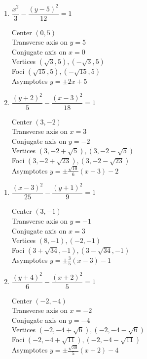 \begin{multicols}{2}
\begin{enumerate}
\setcounter{enumi}{\value{HW}}


\item $\dfrac{x^{2}}{3} - \dfrac{(y - 5)^{2}}{12} = 1$

Center $(0, 5)$\\
Transverse axis on $y = 5$\\
Conjugate axis on $x = 0$\\
Vertices $(\sqrt{3}, 5), (-\sqrt{3}, 5)$\\
Foci $(\sqrt{15}, 5), (-\sqrt{15}, 5)$\\
Asymptotes $y = \pm 2x + 5$

\item $\dfrac{(y + 2)^{2}}{5} - \dfrac{(x - 3)^{2}}{18} = 1$

Center $(3, -2)$\\
Transverse axis on $x = 3$\\
Conjugate axis on $y = -2$\\
Vertices $(3, -2 + \sqrt{5}), (3, -2 - \sqrt{5})$\\
Foci $(3, -2 + \sqrt{23}), (3, -2 - \sqrt{23})$\\
Asymptotes $y = \pm \frac{\sqrt{10}}{6}(x - 3) - 2$


\setcounter{HW}{\value{enumi}}
\end{enumerate}
\end{multicols}


\begin{multicols}{2}
\begin{enumerate}
\setcounter{enumi}{\value{HW}}

\item $\dfrac{(x-3)^{2}}{25} - \dfrac{(y+1)^{2}}{9} = 1$

Center $(3, -1)$\\
Transverse axis on $y=-1$\\
Conjugate axis on $x=3$\\
Vertices $(8, -1), (-2, -1)$\\
Foci $\left(3+\sqrt{34}, -1 \right), \left(3-\sqrt{34}, -1 \right)$\\
Asymptotes $y = \pm \frac{3}{5}(x - 3) - 1$



\item $\dfrac{(y+4)^{2}}{6} - \dfrac{(x+2)^{2}}{5} = 1$

Center $(-2, -4)$\\
Transverse axis on $x=-2$\\
Conjugate axis on $y=-4$\\
Vertices $\left(-2,-4+\sqrt{6} \right), \left(-2,-4-\sqrt{6} \right)$\\
Foci $\left(-2, -4+\sqrt{11} \right), \left(-2, -4-\sqrt{11} \right)$\\
Asymptotes $y = \pm \frac{\sqrt{30}}{5}(x + 2) - 4$


\setcounter{HW}{\value{enumi}}
\end{enumerate}
\end{multicols}


